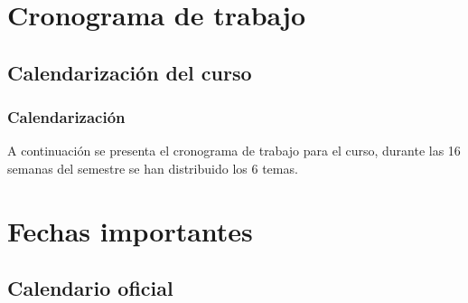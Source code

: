 \section{Cronograma de trabajo}
\subsection{Calendarización del curso}

\begin{frame}
\frametitle{Calendarización}
A continuación se presenta el cronograma de trabajo para el curso, durante las 16 semanas del semestre se han distribuido los 6 temas.
\end{frame}
{

}

\section{Fechas importantes}
\subsection{Calendario oficial}

